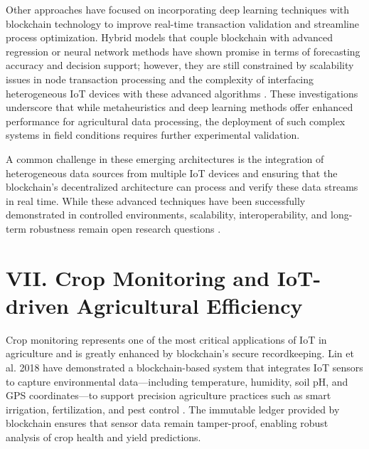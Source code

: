 \documentclass[12pt,onecolumn]{IEEEtran} %
\begin{document}
Other approaches have focused on incorporating deep learning techniques with blockchain technology to improve real-time transaction validation and streamline process optimization. Hybrid models that couple blockchain with advanced regression or neural network methods have shown promise in terms of forecasting accuracy and decision support; however, they are still constrained by scalability issues in node transaction processing and the complexity of interfacing heterogeneous IoT devices with these advanced algorithms \cite{khan2022ablockchainand, rana2020blockchainbasedtraceabilityand}. These investigations underscore that while metaheuristics and deep learning methods offer enhanced performance for agricultural data processing, the deployment of such complex systems in field conditions requires further experimental validation.

A common challenge in these emerging architectures is the integration of heterogeneous data sources from multiple IoT devices and ensuring that the blockchain's decentralized architecture can process and verify these data streams in real time. While these advanced techniques have been successfully demonstrated in controlled environments, scalability, interoperability, and long-term robustness remain open research questions \cite{khan2022ablockchainand}.

\section*{VII. Crop Monitoring and IoT-driven Agricultural Efficiency}

Crop monitoring represents one of the most critical applications of IoT in agriculture and is greatly enhanced by blockchain's secure recordkeeping. Lin et al. 2018 have demonstrated a blockchain-based system that integrates IoT sensors to capture environmental data---including temperature, humidity, soil pH, and GPS coordinates---to support precision agriculture practices such as smart irrigation, fertilization, and pest control \cite{demestichas2020blockchaininagriculture, ali2022blockchainenabledarchitecture}. The immutable ledger provided by blockchain ensures that sensor data remain tamper-proof, enabling robust analysis of crop health and yield predictions.
\end{document}
